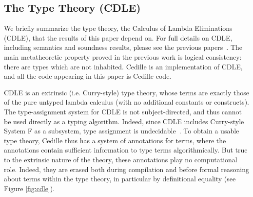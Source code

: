 \documentclass[acmsmall]{acmart}\settopmatter{}
\newcommand{\labsec}[1]{\label{sec:#1}}
\newcommand{\reffig}[1]{Figure \ref{fig:#1}}
\begin{document}
\subsection{The Type Theory (CDLE)}
\labsec{back:cdle}

We briefly summarize the type theory, the Calculus of Lambda
Eliminations (CDLE), that the results of this paper depend on.  For
full details on CDLE, including semantics and soundness results,
please see the previous papers~\cite{stump17a,stump18,lang:cedille}.  The main
metatheoretic property proved in the previous work is logical
consistency: there are types which are not inhabited.  Cedille is an
implementation of CDLE, and all the code appearing in this paper is
Cedille code.

CDLE is an extrinsic (i.e. Curry-style)
type theory, whose terms are exactly those of the pure untyped lambda
calculus (with no additional constants or constructs).  The
type-assignment system for CDLE is not subject-directed, and thus
cannot be used directly as a typing algorithm.  Indeed, since CDLE
includes Curry-style System F as a subsystem, type assignment is
undecidable~\cite{Wells99}.  To obtain a usable type theory, Cedille
thus has a system of annotations for terms, where the annotations
contain sufficient information to type terms algorithmically.  But
true to the extrinsic nature of the theory, these annotations play no
computational role.  Indeed, they are erased both during compilation
and before formal reasoning about terms within the type theory, in
particular by definitional equality (see \reffig{cdle}).
\end{document}
